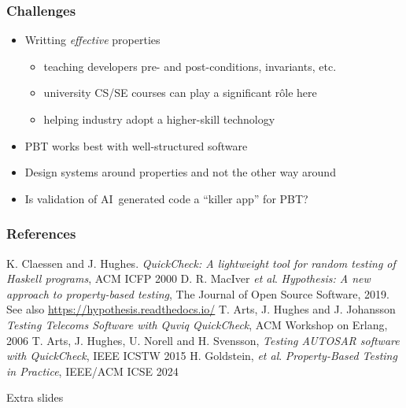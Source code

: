 \documentclass{beamer}
\begin{document}
\begin{frame}
  \frametitle{Challenges}
\begin{itemize}
\item Writting \emph{effective} properties  
  \begin{itemize}
  \item teaching developers pre- and post-conditions, invariants, etc.
  \item university CS/SE courses can play a significant rôle here
  \item helping industry adopt a higher-skill technology 
  \end{itemize}
\item PBT works best with well-structured software
\item Design systems around properties and not the other way around
\item Is validation of AI~generated code a ``killer app''
  for PBT? 
\end{itemize}
\end{frame}

\begin{frame}
  \frametitle{References}

  \begin{thebibliography}{9}
   K. Claessen and J. Hughes.
    \emph{QuickCheck: A lightweight tool for random testing of Haskell
      programs}, ACM ICFP 2000
   D. R. MacIver \emph{et al}.
    \emph{Hypothesis: A new approach to property-based testing},
    The Journal of Open Source Software, 2019.
    See also \url{https://hypothesis.readthedocs.io/}
   T. Arts, J. Hughes and J. Johansson
    \emph{Testing Telecoms Software with Quviq QuickCheck},
    ACM Workshop on Erlang, 2006
   T. Arts, J. Hughes, U. Norell and H. Svensson,
    \emph{Testing AUTOSAR software with QuickCheck}, IEEE ICSTW 2015
   H. Goldstein, \emph{et al}. \emph{Property-Based
      Testing in Practice}, IEEE/ACM ICSE 2024
  \end{thebibliography}


\end{frame}

\begin{frame}
\begin{center}
  \Huge Extra slides
\end{center} 
\end{frame}
\end{document}
